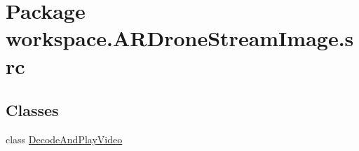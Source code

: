 \hypertarget{namespaceworkspace_1_1_a_r_drone_stream_image_1_1src}{}\section{Package workspace.\+A\+R\+Drone\+Stream\+Image.\+src}
\label{namespaceworkspace_1_1_a_r_drone_stream_image_1_1src}
\subsection*{Classes}
\begin{DoxyCompactItemize}
\item 
class \hyperlink{classworkspace_1_1_a_r_drone_stream_image_1_1src_1_1_decode_and_play_video}{Decode\+And\+Play\+Video}
\end{DoxyCompactItemize}
